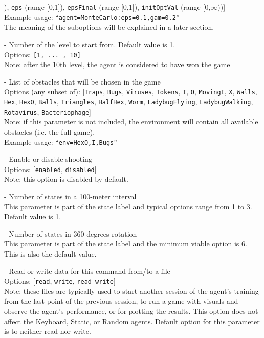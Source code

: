 \begin{description}
[\texttt{gam} (range [0,1]), \texttt{eps} (range [0,1]), \texttt{epsFinal} (range [0,1]), \texttt{initOptVal} (range [0,$\infty$))]\\
Example usage: ``\texttt{agent=MonteCarlo:eps=0.1,gam=0.2}''\\
The meaning of the suboptions will be explained in a later section.
\item[level] - Number of the level to start from. Default value is 1. \label{opt:level}\\
Options: \texttt{[1, ... , 10]}\\
Note: after the 10th level, the agent is considered to have won the game
\item[env] - List of obstacles that will be chosen in the game \label{opt:env}\\
Options (any subset of): [\texttt{Traps}, \texttt{Bugs}, \texttt{Viruses}, \texttt{Tokens},
\texttt{I}, \texttt{O}, \texttt{MovingI}, \texttt{X}, \texttt{Walls}, \texttt{Hex},
\texttt{HexO}, \texttt{Balls}, \texttt{Triangles}, \texttt{HalfHex},
\texttt{Worm}, \texttt{LadybugFlying}, \texttt{LadybugWalking},
\texttt{Rotavirus}, \texttt{Bacteriophage}]\\
Note: if this parameter is not included, the environment will contain all available obstacles (i.e. the full game).\\
Example usage: ``\texttt{env=HexO,I,Bugs}''\\
\item[shooting] - Enable or disable shooting \label{opt:shooting}\\
Options: [\texttt{enabled}, \texttt{disabled}]\\
Note: this option is disabled by default.
\item[dists] - Number of states in a 100-meter interval \label{opt:dists}\\
This parameter is part of the state label and typical options range from 1 to 3. Default value is 1.
\item[rots] - Number of states in 360 degrees rotation \label{opt:rots}\\
This parameter is part of the state label and the minimum viable option is 6. This is also the default value.
\item[database] - Read or write data for this command from/to a file \label{opt:database}\\
Options: [\texttt{read}, \texttt{write}, \texttt{read\_write}]\\
Note: these files are typically used to start another session of the agent's training from the last point of the previous session, to run a game with visuals and observe the agent's performance, or for plotting the results. This option does not affect the Keyboard, Static, or Random agents. Default option for this parameter is to neither read nor write.

\end{description}
